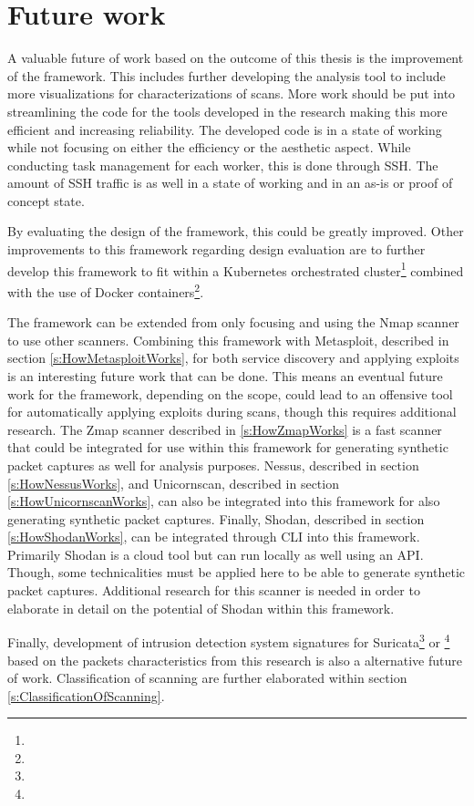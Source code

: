 \section{Future work}
\label{s:ConclusionFutureWork}
A valuable future of work based on the outcome of this thesis is the improvement of the framework.
This includes further developing the analysis tool to include more visualizations for characterizations of scans.
More work should be put into streamlining the code for the tools developed in the research making this more efficient and increasing reliability.
The developed code is in a state of working while not focusing on either the efficiency or the aesthetic aspect.
While conducting task management for each worker, this is done through SSH. The amount of SSH traffic is as well in a state of working and in an as-is or proof of concept state.

By evaluating the design of the framework, this could be greatly improved. Other improvements to this framework regarding design evaluation are to further develop this framework to fit within a Kubernetes orchestrated cluster\footnote{} combined with the use of Docker containers\footnote{}.

The framework can be extended from only focusing and using the Nmap scanner to use other scanners.
Combining this framework with Metasploit, described in section \ref{s:HowMetasploitWorks}, for both service discovery and applying exploits is an interesting future work that can be done.
This means an eventual future work for the framework, depending on the scope, could lead to an offensive tool for automatically applying exploits during scans, though this requires additional research.
The Zmap scanner described in \ref{s:HowZmapWorks} is a fast scanner that could be integrated for use within this framework for generating synthetic packet captures as well for analysis purposes.
Nessus, described in section \ref{s:HowNessusWorks}, and Unicornscan, described in section \ref{s:HowUnicornscanWorks}, can also be integrated into this framework for also generating synthetic packet captures.
Finally, Shodan, described in section \ref{s:HowShodanWorks}, can be integrated through CLI into this framework. Primarily Shodan is a cloud tool but can run locally as well using an API.
Though, some technicalities must be applied here to be able to generate synthetic packet captures. Additional research for this scanner is needed in order to elaborate in detail on the potential of Shodan within this framework.

Finally, development of intrusion detection system signatures for Suricata\footnote{} or \footnote{} based on the packets characteristics from this research is also a alternative future of work.
Classification of scanning are further elaborated within section \ref{s:ClassificationOfScanning}.


